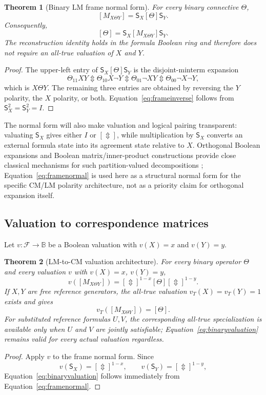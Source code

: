 \documentclass[11pt]{article}
\newtheorem{theorem}{Theorem}[section]
\theoremstyle{definition}
\theoremstyle{remark}
\newcommand{\B}{\mathbb B}
\newcommand{\cF}{\mathcal F}
\newcommand{\xor}{\mathbin{\Updownarrow}}
\begin{document}
\begin{theorem}[Binary LM frame normal form]
For every binary connective $\Theta$,
\begin{equation}
 \boxed{[M_{X\Theta Y}]=\mathsf S_X[\Theta]\mathsf S_Y.}
 \label{eq:framenormal}
\end{equation}
Consequently,
\begin{equation}
 \boxed{[\Theta]=\mathsf S_X[M_{X\Theta Y}]\mathsf S_Y.}
 \label{eq:frameinverse}
\end{equation}
The reconstruction identity holds in the formula Boolean ring and therefore does not require an all-true valuation of $X$ and $Y$.
\end{theorem}
\begin{proof}
The upper-left entry of $\mathsf S_X[\Theta]\mathsf S_Y$ is the disjoint-minterm expansion
\[
 \Theta_{11}XY\xor\Theta_{10}X\neg Y\xor
 \Theta_{01}\neg X Y\xor\Theta_{00}\neg X\neg Y,
\]
which is $X\Theta Y$.  The remaining three entries are obtained by reversing the $Y$ polarity, the $X$ polarity, or both.  Equation~\eqref{eq:frameinverse} follows from $\mathsf S_X^2=\mathsf S_Y^2=I$.
\end{proof}

The normal form will also make valuation and logical pairing transparent: valuating $\mathsf S_X$ gives either $I$ or $[\Updownarrow]$, while multiplication by $\mathsf S_X$ converts an external formula state into its agreement state relative to $X$.  Orthogonal Boolean expansions and Boolean matrix/inner-product constructions provide close classical mechanisms for such partition-valued decompositions \cite{Sampei1950,Gudder2009}; Equation~\eqref{eq:framenormal} is used here as a structural normal form for the specific CM/LM polarity architecture, not as a priority claim for orthogonal expansion itself.

\subsection{Valuation to correspondence matrices}

Let $v:\cF\to\B$ be a Boolean valuation with $v(X)=x$ and $v(Y)=y$.
\begin{theorem}[LM-to-CM valuation architecture]
For every binary operator $\Theta$ and every valuation $v$ with $v(X)=x$, $v(Y)=y$,
\begin{equation}
 v([M_{X\Theta Y}])
 =[\Updownarrow]^{1-x}[\Theta][\Updownarrow]^{1-y}.
 \label{eq:binaryvaluation}
\end{equation}
If $X,Y$ are free reference generators, the all-true valuation $v_T(X)=v_T(Y)=1$ exists and gives
\[
 v_T([M_{X\Theta Y}])=[\Theta].
\]
For substituted reference formulas $U,V$, the corresponding all-true specialization is available only when $U$ and $V$ are jointly satisfiable; Equation~\eqref{eq:binaryvaluation} remains valid for every actual valuation regardless.
\end{theorem}
\begin{proof}
Apply $v$ to the frame normal form.  Since
\[
 v(\mathsf S_X)=[\Updownarrow]^{1-x},\qquad
 v(\mathsf S_Y)=[\Updownarrow]^{1-y},
\]
Equation~\eqref{eq:binaryvaluation} follows immediately from Equation~\eqref{eq:framenormal}.
\end{proof}
\end{document}
